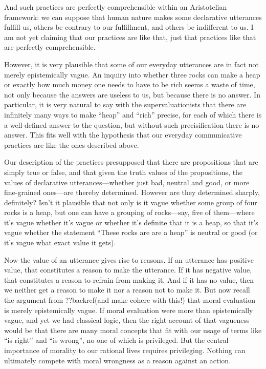 And such practices are perfectly 
comprehensible within an Aristotelian framework: we can suppose that human nature makes some declarative utterances fulfill us, others
be contrary to our fulfillment, and others be indifferent to us.
I am not yet claiming that our practices are like that, just that practices like that are perfectly comprehensible.

However, it is very plausible that some of our everyday utterances are in fact not merely epistemically vague. An inquiry into whether three rocks can make 
a heap or exactly how much money one needs to have to be rich seems a waste of time, not only because the answers are useless to us, 
but because there is no answer. In particular, it is very natural to say with the supervaluationists that there are infinitely many 
ways to make ``heap'' and ``rich'' precise, for each of which there is a well-defined answer to the question, but without such
precisification there is no answer. This fits well with the hypothesis that our everyday communicative practices are  
like the ones described above. 

Our description of the practices presupposed that there are propositions that are simply true or false, and that given the truth
values of the propositions, the values of declarative utterances---whether just bad, neutral and good, or more fine-grained ones---are thereby
determined. However are they determined sharply, definitely? Isn't it plausible that not only is it vague whether some group of four rocks is a heap, 
but one can have a grouping of rocks---say, five of them---where it's vague whether it's vague or whether it's definite that it is a heap, so that 
it's vague whether the statement ``These rocks are are a heap'' is neutral or good (or it's vague what exact value it gets).

Now the value of an utterance gives rise to reasons. If an utterance has positive value, that constitutes a reason to make the utterance.
If it has negative value, that constitutes a reason to refrain from making it. And if it has no value, then we neither get a reason to make
it nor a reason not to make it. But now recall the argument from ??backref(and make cohere with this!) that moral evaluation is merely 
epistemically vague. If moral evaluation were more than epistemically vague, and yet we had classical logic, then the right account 
of that vagueness would be that there
are many moral concepts that fit with our usage of terms like ``is right'' and ``is wrong'', no one of which is privileged. But the 
central importance of morality to our rational lives requires privileging. Nothing can ultimately compete with moral wrongness as a reason
against an action. 

